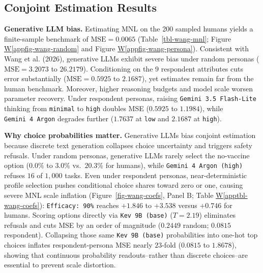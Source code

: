 \documentclass[
  11pt,
  letterpaper,
]{article}
\newcommand*\quartoapptblref[1]{Table \hyperref[#1]{W\ref{#1}}}
\newcommand*\quartoappfigref[1]{Figure \hyperref[#1]{W\ref{#1}}}
\begin{document}
\subsection{Conjoint Estimation
Results}\label{conjoint-estimation-results}

\textbf{Generative LLM bias.} Estimating MNL on the 200 sampled humans
yields a finite-sample benchmark of \(\mathrm{MSE} = 0.0065\)
(Table~\ref{tbl-wang-mnl}; \quartoappfigref{appfig-wang-random} and
\quartoappfigref{appfig-wang-persona}). Consistent with Wang et al.
(2026), generative LLMs exhibit severe bias under random personas
(\(\mathrm{MSE} = 3.2073\) to \(26.2179\)). Conditioning on the \(9\)
respondent attributes cuts error substantially
(\(\mathrm{MSE} = 0.5925\) to \(2.1687\)), yet estimates remain far from
the human benchmark. Moreover, higher reasoning budgets and model scale
worsen parameter recovery. Under respondent personas, raising
\texttt{Gemini\ 3.5\ Flash-Lite} thinking from \texttt{minimal} to
\texttt{high} doubles MSE (\(0.5925\) to \(1.1984\)), while
\texttt{Gemini\ 4\ Argon} degrades further (\(1.7637\) at \texttt{low}
and \(2.1687\) at \texttt{high}).

\textbf{Why choice probabilities matter.} Generative LLMs bias conjoint
estimation because discrete text generation collapses choice uncertainty
and triggers safety refusals. Under random personas, generative LLMs
rarely select the no-vaccine option (\(0.0\%\) to \(3.0\%\)
vs.~\(20.3\%\) for humans), while \texttt{Gemini\ 4\ Argon\ (high)}
refuses \(16\) of \(1,000\) tasks. Even under respondent personas,
near-deterministic profile selection pushes conditional choice shares
toward zero or one, causing severe MNL scale inflation
(Figure~\ref{fig-wang-coefs}, Panel B;
\quartoapptblref{apptbl-wang-coefs}): \texttt{Efficacy:\ 90\%} reaches
\(+1.846\) to \(+3.538\) versus \(+0.746\) for humans. Scoring options
directly via \texttt{Kev\ 9B\ (base)} (\(T = 2.19\)) eliminates refusals
and cuts MSE by an order of magnitude (\(0.2449\) random; \(0.0815\)
respondent). Collapsing those same \texttt{Kev\ 9B\ (base)}
probabilities into one-hot top choices inflates respondent-persona MSE
nearly \(23\)-fold (\(0.0815\) to \(1.8678\)), showing that continuous
probability readouts--rather than discrete choices--are essential to
prevent scale distortion.
\end{document}
